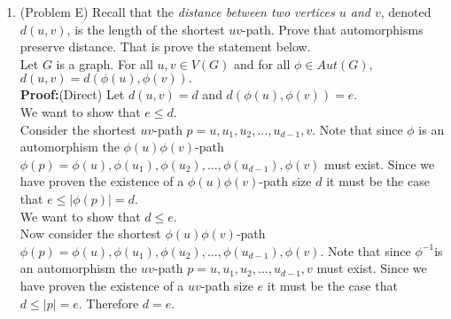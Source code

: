 \documentclass{amsart}
\begin{document}
\begin{enumerate}
(b) Give an example of a graph $G$ on 12 vertices with minimum degree 2 such that $|Aut(G)|=1.$\\

\textbf{Answer:}
Consider the following graph,
\begin{figure}[H]
\caption{}
\centering
\texttt{[image: "Auto1".png]}
\end{figure}
Taking the graph from before and appending three more vertices such that we remove the two rotation symmetries and also create no reflection symmetries. 

\vspace{1.5in}

\item (Problem E) Recall that the \emph{distance between two vertices $u$ and $v$}, denoted $d(u,v)$, is the length of the shortest $uv$-path. Prove that automorphisms preserve distance. That is prove the statement below. \\ 
Let $G$ is a graph. For all $u,v \in V(G)$ and for all $\phi \in Aut(G),$ $d(u,v)=d(\phi(u),\phi(v)).$  \\

\textbf{Proof:}(Direct) Let $d(u,v) = d$ and $d(\phi(u),\phi(v)) = e$.\\

We want to show that $e \leq d$.\\
Consider the shortest $uv$-path $p = u,u_1,u_2,...,u_{d-1},v$. Note that since $\phi$ is an automorphism the $\phi(u)\phi(v)$-path $\phi(p) = \phi(u),\phi(u_1),\phi(u_2),...,\phi(u_{d-1}),\phi(v)$ must exist. Since we have proven the existence of a $\phi(u)\phi(v)$-path size $d$ it must be the case that $e \leq |\phi(p)| = d$. \\

We want to show that $d \leq e$.\\
Now consider the shortest $\phi(u)\phi(v)$-path $\phi(p) = \phi(u),\phi(u_1),\phi(u_2),...,\phi(u_{d-1}),\phi(v)$. Note that since $\phi^{-1}$is an automorphism the $uv$-path $p = u,u_1,u_2,...,u_{d-1},v$ must exist. Since we have proven the existence of a $uv$-path size $e$ it must be the case that $d \leq |p| = e$. 
Therefore $d = e$.

\vspace{1.5in}



\end{enumerate}
\end{document}
